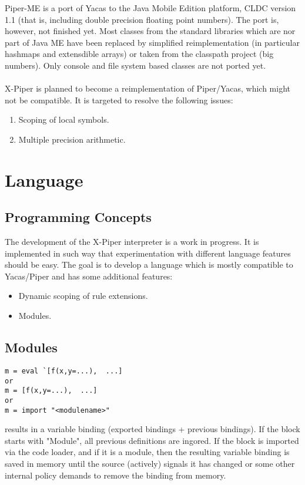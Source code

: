 Piper-ME is a port of Yacas to the Java Mobile Edition platform, CLDC version 1.1 
(that is, including double precision floating point numbers). The port is, however,
not finished yet. Most classes from the standard libraries which are nor part of
Java ME have been replaced by simplified reimplementation (in particular hashmaps
and extensdible arrays) or taken from the classpath project (big numbers). Only
console and file system based classes are not ported yet.\\
\\
X-Piper is planned to become a reimplementation of Piper/Yacas, which might
not be compatible. It is targeted to resolve the following issues:
\begin{enumerate}
\item Scoping of local symbols.
\item Multiple precision arithmetic.
\end{enumerate}


\chapter{Language}

\section{Programming Concepts}

The development of the X-Piper interpreter is a work in progress. It is implemented
in such way that experimentation with different language features should be easy.
The goal is to develop a language which is mostly compatible to Yacas/Piper and
has some additional features:

\begin{itemize}
\item Dynamic scoping of rule extensions.
\item Modules.
\end{itemize}

\section{Modules}

\begin{verbatim}
m = eval `[f(x,y=...),  ...]
or
m = [f(x,y=...),  ...]
or
m = import "<modulename>"
\end{verbatim}

results in a variable binding (exported bindings + previous bindings).
If the block starts with  "Module", all previous definitions are
ingored. If the block is imported via the code loader, and if
it is a module, then the resulting variable binding is saved in
memory until the source (actively) signals it has changed or
some other internal policy demands to remove the binding from
memory.

